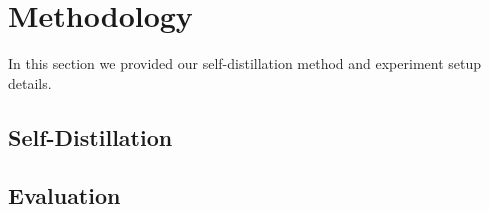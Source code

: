 \documentclass[10pt,twocolumn,letterpaper]{article}
\begin{document}
\section{Methodology}
In this section we provided our self-distillation method and experiment setup details.
\subsection{Self-Distillation}
   
\subsection{Evaluation}


{\small


}
\end{document}
